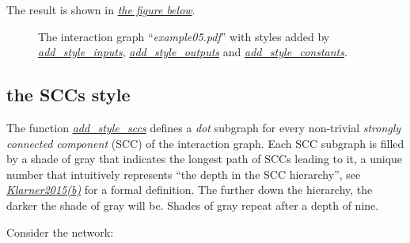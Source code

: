 \documentclass[letterpaper,10pt,english]{sphinxmanual}
\begin{document}
The result is shown in {\hyperref[Manual:figure04]{\emph{the figure below}}}.
\begin{figure}[htbp]
\centering
\capstart

\caption{The interaction graph ``\emph{example05.pdf}'' with styles added by {\hyperref[InteractionGraphs:add-style-inputs]{\emph{add\_style\_inputs}}}, {\hyperref[InteractionGraphs:add-style-outputs]{\emph{add\_style\_outputs}}} and {\hyperref[InteractionGraphs:add-style-constants]{\emph{add\_style\_constants}}}.}\label{Manual:figure04}\end{figure}


\subsection{the SCCs style}
\label{Manual:the-sccs-style}
The function {\hyperref[StateTransitionGraphs:add-style-sccs]{\emph{add\_style\_sccs}}} defines a \emph{dot} subgraph for every non-trivial \emph{strongly connected component} (SCC) of the interaction graph.
Each SCC subgraph is filled by a shade of gray that indicates the longest path of SCCs leading to it,
a unique number that intuitively represents ``the depth in the SCC hierarchy'', see {\hyperref[Bibliography:klarner2015approx]{\emph{Klarner2015(b)}}} for a formal definition.
The further down the hierarchy, the darker the shade of gray will be.
Shades of gray repeat after a depth of nine.

Consider the network:
\end{document}
